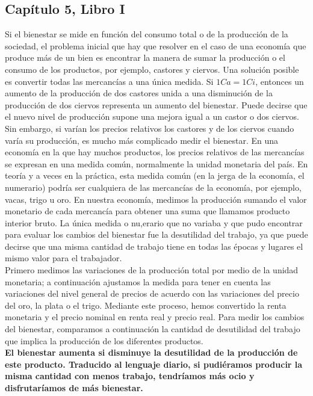 \documentclass[10pt]{book}
\begin{document}
\subsection*{Capítulo 5, Libro I}
Si el bienestar se mide en función del consumo total o de la producción de la sociedad, el problema inicial que hay que resolver en el caso de una economía que produce más de un bien es encontrar la manera de sumar la producción o el consumo de los productos, por ejemplo, castores y ciervos. Una solución posible es convertir todas las mercancías a una única medida. Si $1Ca = 1Ci$, entonces un aumento de la producción de dos castores unida a una disminución de la producción de dos ciervos representa un aumento del bienestar. Puede decirse que el nuevo nivel de producción supone una mejora igual a un castor o dos ciervos. Sin embargo, si varían los precios relativos los castores y de los ciervos cuando varía su producción, es mucho más complicado medir el bienestar. En una economía en la que hay muchos productos, los precios relativos de las mercancías se expresan en una medida común, normalmente la unidad monetaria del país. En teoría y a veces en la práctica, esta medida común (en la jerga de la economía, el numerario) podría ser cualquiera de las mercancías de la economía, por ejemplo, vacas, trigo u oro. En nuestra economía, medimos la producción sumando el valor monetario de cada mercancía para obtener una suma que llamamos producto interior bruto. La única medida o nu,erario que no variaba y que pudo encontrar para evaluar los cambios del bienestar fue la desutilidad del trabajo, ya que puede decirse que una misma cantidad de trabajo tiene en todas las épocas y lugares el mismo valor para el trabajador.\\
Primero medimos las variaciones de la producción total por medio de la unidad monetaria; a continuación ajustamos la medida para tener en cuenta las variaciones del nivel general de precios de acuerdo con las variaciones del precio del oro, la plata o el trigo. Mediante este proceso, hemos convertido la renta monetaria y el precio nominal en renta real y precio real. Para medir los cambios del bienestar, comparamos a continuación la cantidad de desutilidad del trabajo que implica la producción de los diferentes productos.\\
\textbf{El bienestar aumenta si disminuye la desutilidad de la producción de este producto. Traducido al lenguaje diario, si pudiéramos producir la misma cantidad con menos trabajo, tendríamos más ocio y disfrutaríamos de más bienestar.}
\end{document}
